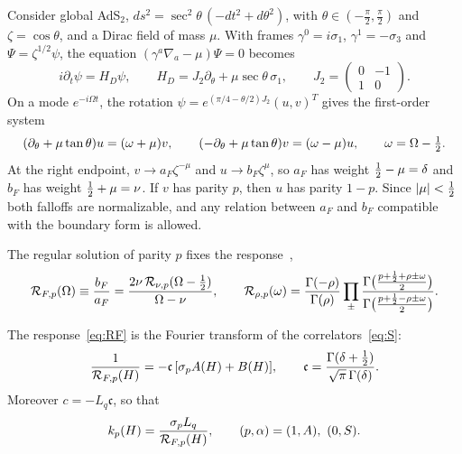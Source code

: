 Consider global AdS$_2$, $ds^2=\sec^2\theta\,(-dt^2+d\theta^2)$, with $\theta\in(-\frac\pi2,\frac\pi2)$ and $\zeta=\cos\theta$, and a Dirac field of mass $\mu$. With frames $\gamma^0=i\sigma_1$, $\gamma^1=-\sigma_3$ and $\Psi=\zeta^{1/2}\psi$, the equation $(\gamma^a\nabla_a-\mu)\Psi=0$ becomes
\begin{equation}\label{eq:HD}
i\partial_t\psi=H_D\psi,\qquad H_D=J_2\partial_\theta+\mu\sec\theta\,\sigma_1,\qquad J_2=\begin{pmatrix}0&-1\\1&0\end{pmatrix}.
\end{equation}
On a mode $e^{-i\Omega t}$, the rotation $\psi=e^{(\pi/4-\theta/2)J_2}(u,v)^T$ gives the first-order system
\begin{equation}\label{eq:first-order}
(\partial_\theta+\mu\tan\theta)u=(\omega+\mu)v,\qquad(-\partial_\theta+\mu\tan\theta)v=(\omega-\mu)u,\qquad\omega=\Omega-\tfrac12.
\end{equation}
At the right endpoint, $v\to a_F\zeta^{-\mu}$ and $u\to b_F\zeta^{\mu}$, so $a_F$ has weight $\tfrac12-\mu=\delta$ and $b_F$ has weight $\tfrac12+\mu=\nu$. If $v$ has parity $p$, then $u$ has parity $1-p$. Since $|\mu|<\tfrac12$ both falloffs are normalizable, and any relation between $a_F$ and $b_F$ compatible with the boundary form is allowed.

The regular solution of parity $p$ fixes the response~\cite{Thong:2026},
\begin{equation}\label{eq:RF}
\mathcal{R}_{F,p}(\Omega)\equiv\frac{b_F}{a_F}=\frac{2\nu\,\mathcal{R}_{\nu,p}(\Omega-\tfrac12)}{\Omega-\nu},\qquad\mathcal{R}_{\rho,p}(\omega)=\frac{\Gamma(-\rho)}{\Gamma(\rho)}\prod_\pm\frac{\Gamma\big(\frac{p+\frac12+\rho\pm\omega}{2}\big)}{\Gamma\big(\frac{p+\frac12-\rho\pm\omega}{2}\big)}.
\end{equation}

\begin{proposition}\label{prop:response}
The response~\eqref{eq:RF} is the Fourier transform of the correlators~\eqref{eq:S}:
\begin{equation}\label{eq:RF-AB}
\frac{1}{\mathcal{R}_{F,p}(H)}=-\mathfrak c\,[\sigma_pA(H)+B(H)],\qquad\mathfrak c=\frac{\Gamma(\delta+\tfrac12)}{\sqrt\pi\,\Gamma(\delta)}.
\end{equation}
Moreover $c=-L_q\mathfrak c$, so that
\begin{equation}\label{eq:k-RF}
k_p(H)=\frac{\sigma_pL_q}{\cR_{F,p}(H)},\qquad(p,\alpha)=(1,A),\ (0,S).
\end{equation}
\end{proposition}

